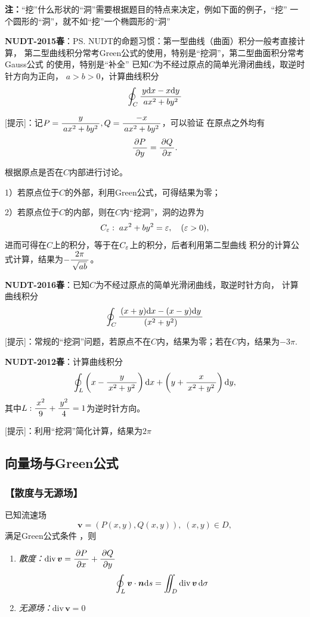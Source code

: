 {\bf 注：}“挖”什么形状的“洞”需要根据题目的特点来决定，例如下面的例子，“挖”
一个圆形的“洞”，就不如“挖”一个椭圆形的“洞”

{\bf NUDT-2015春}：\ps{NUDT的命题习惯：第一型曲线（曲面）积分一般考直接计算，
第二型曲线积分常考Green公式的使用，特别是“挖洞”，第二型曲面积分常考Gauss公式
的使用，特别是“补全”}
已知$C$为不经过原点的简单光滑闭曲线，取逆时针方向为正向，
$a>b>0$，计算曲线积分
$$\oint_C\displaystyle\frac{\,{y\mathrm{d} x-x\mathrm{d} y}\,}{\,{ax^2+by^2}\,}$$

[提示]：记$P=\displaystyle\frac{\,{y}\,}{\,{ax^2+by^2}\,},Q=\displaystyle\frac{\,{-x}\,}{\,{ax^2+by^2}\,}$，可以验证
在原点之外均有
$$\displaystyle\frac{\,{\partial P}\,}{\,{\partial y}\,}=\displaystyle\frac{\,{\partial Q}\,}{\,{\partial x}\,}.$$

根据原点是否在$C$内部进行讨论。

1）若原点位于$C$的外部，利用Green公式，可得结果为零；

2）若原点位于$C$的内部，则在$C$内“挖洞”，洞的边界为
$$C_{\varepsilon}:\;ax^2+by^2=\varepsilon,\quad(\varepsilon>0),$$
进而可得在$C$上的积分，等于在$C_{\varepsilon}$上的积分，后者利用第二型曲线
积分的计算公式计算，结果为$-\displaystyle\frac{\,{2\pi}\,}{\,{\sqrt{ab}}\,}$。

{\bf NUDT-2016春}：已知$C$为不经过原点的简单光滑闭曲线，取逆时针方向，
计算曲线积分
$$\oint_C\displaystyle\frac{\,{(x+y)\mathrm{d} x-(x-y)\mathrm{d} y}\,}{\,{(x^2+y^2)}\,}$$

[提示]：常规的“挖洞”问题，若原点不在$C$内，结果为零；若在$C$内，结果为$-3\pi$.

{\bf NUDT-2012春}：计算曲线积分
$$\oint_L\left(x-\displaystyle\frac{\,{y}\,}{\,{x^2+y^2}\,}\right)\mathrm{d} x
+\left(y+\displaystyle\frac{\,{x}\,}{\,{x^2+y^2}\,}\right)\mathrm{d} y,$$
其中$L:\displaystyle\frac{\,{x^2}\,}{\,{9}\,}+\displaystyle\frac{\,{y^2}\,}{\,{4}\,}=1$为逆时针方向。

[提示]：利用“挖洞”简化计算，结果为$2\pi$

\subsection{向量场与Green公式}

\subsubsection{【散度与无源场】}

已知流速场
$$\bm{v}=(P(x,y),Q(x,y)),\;(x,y)\in D,$$
满足Green公式条件 ，则
\begin{enumerate}[(1)]
  \setlength{\itemindent}{1cm}
  \item {\it 散度：}${\mathrm{div}\,\bm v=\displaystyle\frac{\,{\partial P}\,}{\,{\partial x}\,}+\displaystyle\frac{\,{\partial Q}\,}{\,{\partial
  y}\,}}$ 
  $$\oint_L\bm{v}\cdot\bm{n}\mathrm{d}
  s=\iint_D\mathrm{div}\,\bm{v}\,\mathrm{d}\sigma$$
  \item {\it 无源场：}${\mathrm{div}\,\bm{v}=0}$
\end{enumerate}

